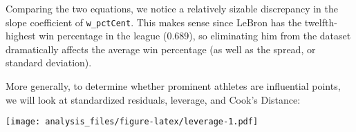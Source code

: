\documentclass[]{article}
\newenvironment{Shaded}{\begin{snugshade}}{\end{snugshade}}
\newcommand{\DataTypeTok}[1]{\textcolor[rgb]{0.13,0.29,0.53}{#1}}
\newcommand{\DecValTok}[1]{\textcolor[rgb]{0.00,0.00,0.81}{#1}}
\newcommand{\KeywordTok}[1]{\textcolor[rgb]{0.13,0.29,0.53}{\textbf{#1}}}
\newcommand{\NormalTok}[1]{#1}
\newcommand{\OperatorTok}[1]{\textcolor[rgb]{0.81,0.36,0.00}{\textbf{#1}}}
\newcommand{\StringTok}[1]{\textcolor[rgb]{0.31,0.60,0.02}{#1}}
\begin{document}
Comparing the two equations, we notice a relatively sizable discrepancy
in the slope coefficient of \texttt{w\_pctCent}. This makes sense since
LeBron has the twelfth-highest win percentage in the league (0.689), so
eliminating him from the dataset dramatically affects the average win
percentage (as well as the spread, or standard deviation).

More generally, to determine whether prominent athletes are influential
points, we will look at standardized residuals, leverage, and Cook's
Distance:

\begin{Shaded}
\end{Shaded}

\texttt{[image: analysis\_files/figure-latex/leverage-1.pdf]}

\begin{Shaded}
\end{Shaded}
\end{document}
